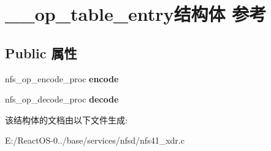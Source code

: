\hypertarget{struct____op__table__entry}{}\section{\+\_\+\+\_\+op\+\_\+table\+\_\+entry结构体 参考}
\label{struct____op__table__entry}
\subsection*{Public 属性}
\begin{DoxyCompactItemize}
\item 
\mbox{\label{struct____op__table__entry_a30e6e3614332f6ff0a607a2d94bac157}} 
nfs\+\_\+op\+\_\+encode\+\_\+proc {\bfseries encode}
\item 
\mbox{\label{struct____op__table__entry_af74b341601a2fa35a7fcfe83d4567914}} 
nfs\+\_\+op\+\_\+decode\+\_\+proc {\bfseries decode}
\end{DoxyCompactItemize}


该结构体的文档由以下文件生成\+:\begin{DoxyCompactItemize}
\item 
E\+:/\+React\+O\+S-\/0../base/services/nfsd/nfs41\+\_\+xdr.\+c\end{DoxyCompactItemize}
